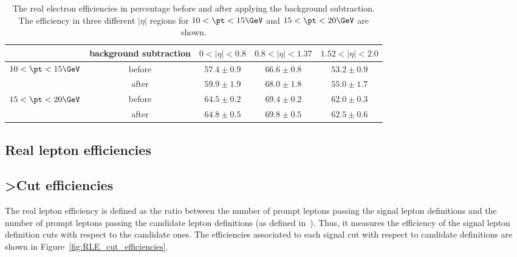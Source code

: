 \begin{table}[htbp]
\begin{center}
\begin{tabular}{ccccc}
\hline
\hline
& background subtraction & $0<|\eta|<0.8$ & $0.8<|\eta|<1.37$ & $1.52<|\eta|<2.0$\\
\hline
\multirow{2}{*}{$10<\pt<15 \GeV$} & before & $57.4 \pm 0.9$ & $66.6 \pm 0.8$ & $53.2 \pm 0.9$\\
& after & $59.9 \pm 1.9$ & $68.0 \pm 1.8$ & $55.0 \pm 1.7$\\
\hline
\multirow{2}{*}{$15<\pt<20 \GeV$} & before & $64.5 \pm 0.2$ & $69.4 \pm 0.2$ & $62.0 \pm 0.3$\\
& after & $64.8 \pm 0.5$ & $69.8 \pm 0.5$ & $62.5 \pm 0.6$\\
\hline
\hline
\end{tabular}
\end{center}
\caption{The real electron efficiencies in percentage before and after applying the background subtraction.
The efficiency in three different $|\eta|$ regions for $10<\pt<15 \GeV$ and $15<\pt<20 \GeV$ are shown.}
\label{tab:RLE_efficiency_before_and_after_background_subtraction}
\end{table}





\subsection{Real lepton efficiencies}
\label{subsubsec:RLE_electron_efficiency}

\subsection{>Cut efficiencies}
\label{subsubsec:RLE_cut_efficiencies}

The real lepton efficiency is defined as the ratio between the number of prompt leptons passing the signal lepton definitions and the number of prompt leptons passing the candidate lepton definitions (as defined in~\cite{SS3L-Moriond2017}). Thus, it measures the efficiency of the signal lepton definition cuts with respect to the candidate ones.
The efficiencies associated to each signal cut with respect to candidate definitions are shown in Figure~\ref{fig:RLE_cut_efficiencies}.

